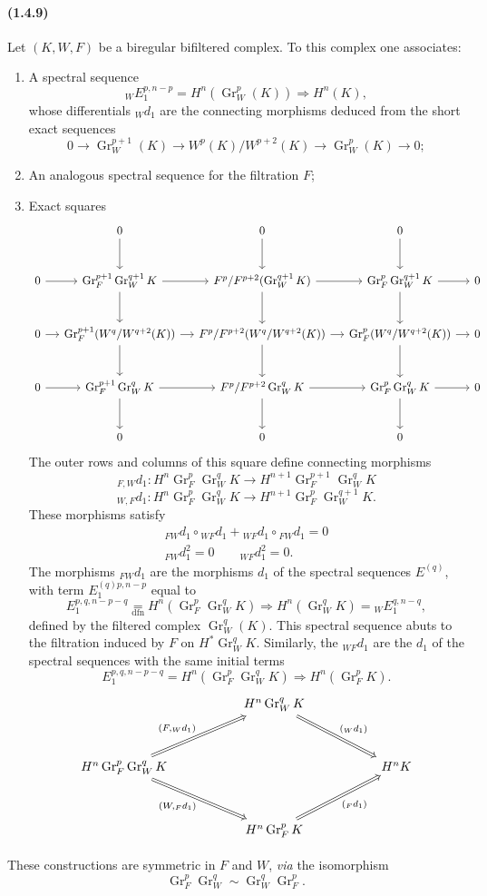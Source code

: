 \documentclass[10pt]{article}
\newcommand{\Gr}{\operatorname{Gr}}
\begin{document}
\paragraph{(1.4.9)} Let $(K,W,F)$ be a biregular bifiltered complex. To this complex one associates:
\begin{enumerate}[label=\alph*)]
\item A spectral sequence
\[
{}_WE_1^{p,n-p}=H^n(\Gr_W^p(K))\Rightarrow H^n(K),
\]
whose differentials ${}_Wd_1$ are the connecting morphisms deduced from the short exact sequences
\[
0\to\Gr_W^{p+1}(K)\to W^p(K)/W^{p+2}(K)\to\Gr_W^p(K)\to0;
\]
\item An analogous spectral sequence for the filtration $F$;
\item Exact squares
\[
\begin{tikzcd}[column sep=small,row sep=large]
& 0 \arrow[d] & 0 \arrow[d] & 0 \arrow[d] & \\
0 \arrow[r] & \Gr_F^{p+1}\Gr_W^{q+1}K \arrow[r] \arrow[d] & F^p/F^{p+2}(\Gr_W^{q+1}K) \arrow[r] \arrow[d] & \Gr_F^{p}\Gr_W^{q+1}K \arrow[r] \arrow[d] & 0\\
0 \arrow[r] & \Gr_F^{p+1}(W^q/W^{q+2}(K)) \arrow[r] \arrow[d] & F^p/F^{p+2}(W^q/W^{q+2}(K)) \arrow[r] \arrow[d] & \Gr_F^{p}(W^q/W^{q+2}(K)) \arrow[r] \arrow[d] & 0\\
0 \arrow[r] & \Gr_F^{p+1}\Gr_W^{q}K \arrow[r] \arrow[d] & F^p/F^{p+2}\Gr_W^{q}K \arrow[r] \arrow[d] & \Gr_F^{p}\Gr_W^{q}K \arrow[r] \arrow[d] & 0\\
& 0 & 0 & 0
\end{tikzcd}
\]
The outer rows and columns of this square define connecting morphisms
\[
{}_{F,W}d_1:H^n\Gr_F^p\Gr_W^qK\longrightarrow H^{n+1}\Gr_F^{p+1}\Gr_W^qK
\]
\[
{}_{W,F}d_1:H^n\Gr_F^p\Gr_W^qK\longrightarrow H^{n+1}\Gr_F^p\Gr_W^{q+1}K.
\]
These morphisms satisfy
\[
\begin{gathered}
{}_{FW}d_1\circ{}_{WF}d_1+{}_{WF}d_1\circ{}_{FW}d_1=0\\
{}_{FW}d_1^2=0\qquad {}_{WF}d_1^2=0.
\end{gathered}
\]
The morphisms ${}_{FW}d_1$ are the morphisms $d_1$ of the spectral sequences $E^{(q)}$, with term $E_1^{(q)p,n-p}$ equal to
\[
\tag{1.4.9.1}
E_1^{p,q,n-p-q}\underset{\mathrm{dfn}}{=}H^n(\Gr_F^p\Gr_W^qK)\Rightarrow H^n(\Gr_W^qK)={}_WE_1^{q,n-q},
\]
defined by the filtered complex $\Gr_W^q(K)$. This spectral sequence abuts to the filtration induced by $F$ on $H^*\Gr_W^qK$. Similarly, the ${}_{WF}d_1$ are the $d_1$ of the spectral sequences with the same initial terms
\[
\tag{1.4.9.2}
E_1^{p,q,n-p-q}=H^n(\Gr_F^p\Gr_W^qK)\Rightarrow H^n(\Gr_F^pK).
\]
\[
\begin{tikzcd}[column sep=5.2em,row sep=3.2em]
& H^n\Gr_W^qK
  \arrow[dr,Rightarrow,"{\scriptstyle({}_Wd_1)}"]
& \\
H^n\Gr_F^p\Gr_W^qK
  \arrow[ur,Rightarrow,"{\scriptstyle(F,{}_Wd_1)}"]
  \arrow[dr,Rightarrow,"{\scriptstyle(W,{}_Fd_1)}"']
&& H^nK \\
& H^n\Gr_F^pK
  \arrow[ur,Rightarrow,"{\scriptstyle({}_Fd_1)}"']
&
\end{tikzcd}
\]
\end{enumerate}
These constructions are symmetric in $F$ and $W$, \emph{via} the isomorphism
\[
\Gr_F^p\Gr_W^q\sim\Gr_W^q\Gr_F^p.
\]
\end{document}
